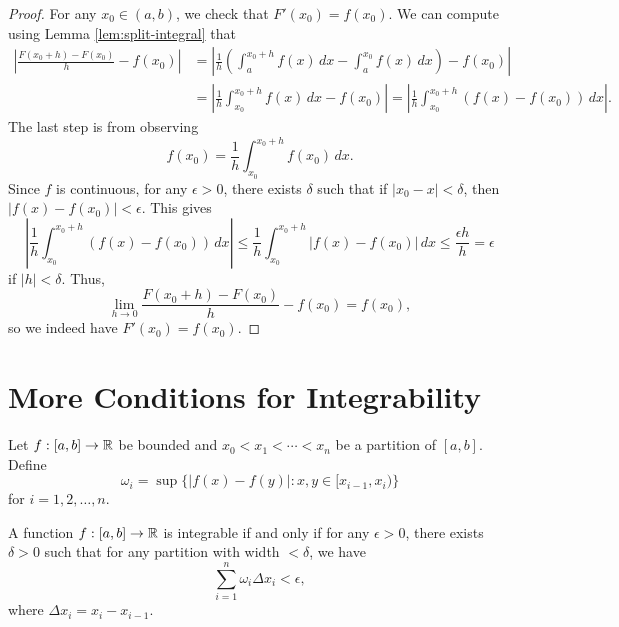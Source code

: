 \begin{proof}
  For any $x_0 \in (a, b)$, we check that
  $F'(x_0) = f(x_0)$. We can compute using Lemma
  \ref{lem:split-integral} that
  \begin{align*}
    \left| \frac{F(x_0 + h) - F(x_0)}{h} - f(x_0) \right|
    &= \left| \frac{1}{h} \left( \int_a^{x_0 + h} f(x)\, dx - \int_a^{x_0} f(x)\, dx \right) - f(x_0) \right| \\
    &= \left| \frac{1}{h} \int_{x_0}^{x_0 + h} f(x)\, dx - f(x_0) \right|
    = \left| \frac{1}{h} \int_{x_0}^{x_0 + h} (f(x) - f(x_0))\, dx \right|.
  \end{align*}
  The last step is from observing
  \[
    f(x_0) = \frac{1}{h} \int_{x_0}^{x_0 + h} f(x_0)\, dx.
  \]
  Since $f$ is continuous, for any $\epsilon > 0$, there
  exists $\delta$
  such that if $|x_0 - x| < \delta$, then
  $|f(x) - f(x_0)| < \epsilon$. This gives
  \[
    \left| \frac{1}{h} \int_{x_0}^{x_0 + h} (f(x) - f(x_0))\, dx \right|
    \le \frac{1}{h} \int_{x_0}^{x_0 + h} |f(x) - f(x_0)|\, dx
    \le \frac{\epsilon h}{h} = \epsilon
  \]
  if $|h| < \delta$. Thus,
  \[
    \lim_{h \to 0} \frac{F(x_0 + h) - F(x_0)}{h} - f(x_0) = f(x_0),
  \]
  so we indeed have $F'(x_0) = f(x_0)$.
\end{proof}

\section{More Conditions for Integrability}
\begin{definition}
  Let $f : [a, b] \to \mathbb{R}$ be bounded and
  $x_0 < x_1 < \cdots < x_n$ be a partition of $[a, b]$.
  Define
  \[
    \omega_i = \sup\{|f(x) - f(y)| : x, y \in [x_{i - 1}, x_i)\}
  \]
  for $i = 1, 2, \dots, n$.
\end{definition}

\begin{theorem}
  A function $f : [a, b] \to \mathbb{R}$ is integrable if and only
  if for any $\epsilon > 0$, there exists $\delta > 0$
  such that for any partition with width $< \delta$,
  we have
  \[
    \sum_{i = 1}^n \omega_i \Delta x_i < \epsilon,
  \]
  where $\Delta x_i = x_i - x_{i - 1}$.
\end{theorem}

